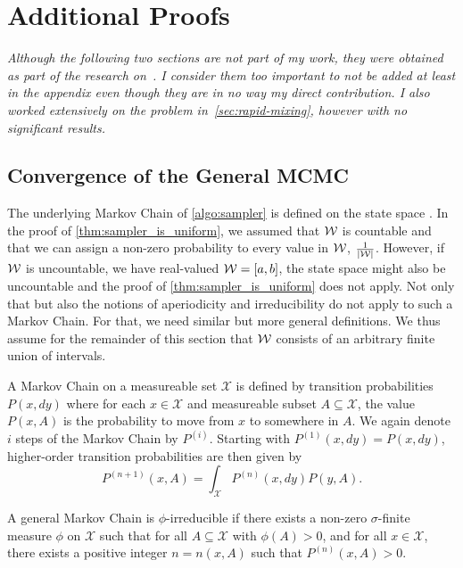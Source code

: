 \chapter{Additional Proofs}\label{sec:additional_proofs}
\textit{
  Although the following two sections are not part of my work, they were obtained as part of the research on~\cite{RNEW}.
  I consider them too important to not be added at least in the appendix even though they are in no way my direct contribution.
  I also worked extensively on the problem in~\cref{sec:rapid-mixing}, however with no significant results.
}

\section{Convergence of the General MCMC~\cite{RNEW}}\label{sec:general-convergence}
The underlying Markov Chain of \cref{algo:sampler} is defined on the state space \constates.
In the proof of \cref{thm:sampler_is_uniform}, we assumed that $\mathcal W$ is countable and that we can assign a non-zero probability to every value in $\mathcal W$, \ie $\frac{1}{|\mathcal W|}$.
However, if $\mathcal W$ is uncountable, \eg we have real-valued $\mathcal W = [a,b]$, the state space \cstates might also be uncountable and the proof of \cref{thm:sampler_is_uniform} does not apply.
Not only that but also the notions of aperiodicity and irreducibility do not apply to such a Markov Chain.
For that, we need similar but more general definitions.
We thus assume for the remainder of this section that $\mathcal W$ consists of an arbitrary finite union of intervals.

A Markov Chain on a measureable set $\mathcal{X}$ is defined by transition probabilities $P(x, dy)$ where for each $x \in \mathcal{X}$ and measureable subset $A \subseteq \mathcal{X}$, the value $P(x, A)$ is the probability to move from $x$ to somewhere in $A$.
We again denote $i$ steps of the Markov Chain by $P^{(i)}$.
Starting with $P^{(1)}(x, dy) = P(x, dy)$, higher-order transition probabilities are then given by \[
  P^{(n + 1)}(x, A) = \int_{\mathcal{X}}P^{(n)}(x, dy)P(y, A).
\]

\begin{definition}
  A general Markov Chain is $\phi$-irreducible if there exists a non-zero $\sigma$-finite measure $\phi$ on $\mathcal{X}$ such that for all $A \subseteq \mathcal{X}$ with $\phi(A) > 0$, and for all $x \in \mathcal{X}$, there exists a positive integer $n = n(x, A)$ such that $P^{(n)}(x, A) > 0$.
\end{definition}

